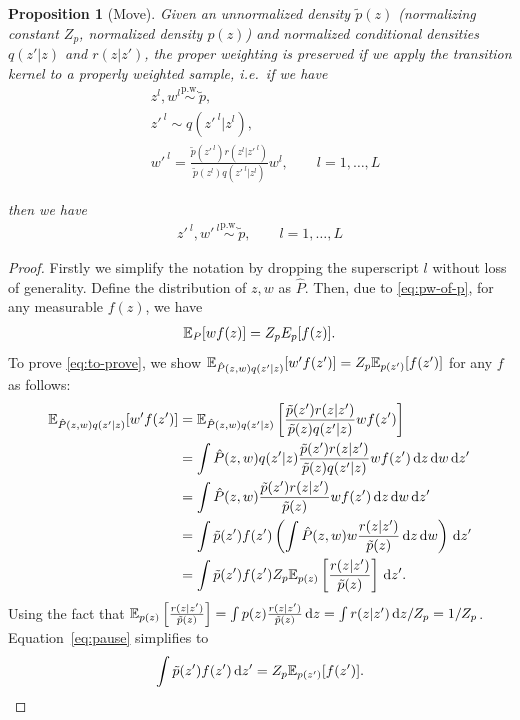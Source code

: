 \documentclass{article}
\newtheorem{proposition}{Proposition}
\theoremstyle{definition}
\newcommand{\given}{\lvert}
\newcommand{\pw}{\overset{\text{p.w.}}{\sim}
}
\begin{document}
\begin{proposition}[Move]
\label{proposition:extendedspace}
    Given an unnormalized density $\tilde p(z)$ (normalizing constant $Z_p$, normalized density $p(z)$) and normalized conditional densities $q(z' \given z)$ and $r(z \given z')$, the proper weighting is preserved if we apply the transition kernel to a properly weighted sample, i.e.~if we have
    \begin{align}
        &
        z^l, w^l \pw \tilde p, \label{eq:pw-of-p}\\[1em]
        &
         z'^{\:l} \sim q(z'^{\:l} \given z^l),  \label{eq:z-prime}\\[1em]
        &
        w'^{\:l} = \frac{\tilde p(z'^{\:l})r(z^l \given z'^{\:l})}{\tilde p(z^l)q(z'^{\:l} \given z^l)} w^l, \qquad l = 1, \ldots, L \label{eq:w-prime}
    \end{align}

then we have
    \begin{align}
        z'^{\:l}, w'^{\:l} \pw \tilde p, \qquad  l = 1, \ldots, L \label{eq:to-prove}
    \end{align}
\end{proposition}
\begin{proof}
    Firstly we simplify the notation by dropping the superscript $l$ without loss of generality. Define the distribution of $z, w$ as $\hat{P}$.
    Then, due to \eqref{eq:pw-of-p}, for any measurable $f(z)$, we have
    \begin{align*}
        \mathbb{E}_P[w f(z)] = Z_p E_{p}[f(z)].
    \end{align*}
    To prove \eqref{eq:to-prove}, we show $\E_{\hat{P}(z, w)q(z' \given z)}[w' f(z')] = Z_p \E_{p(z')}[f(z')]$ for any $f$ as follows:
    \begin{align}
        \E_{\hat{P}(z, w)q(z' \given z)}[w' f(z')]
        &= \E_{\hat{P}(z, w)q(z' \given z)}\left[\frac{\tilde p(z')r(z \given z')}{\tilde p(z)q(z' \given z)} w f(z')\right] 
        \nonumber\\
        &= \int \hat{P}(z, w)q(z' \given z) \frac{\tilde p(z')r(z \given z')}{\tilde p(z)q(z' \given z)} w f(z') \,\mathrm dz \,\mathrm dw \,\mathrm dz' 
        \nonumber\\
        &= \int \hat{P}(z, w) \frac{\tilde p(z')r(z \given z')}{\tilde p(z)} w f(z') \,\mathrm dz \,\mathrm dw \,\mathrm dz' 
        \nonumber\\
        &= \int \tilde p(z') f(z') \left(\int \hat{P}(z, w) w \frac{r(z \given z')}{\tilde p(z)}\,\mathrm dz \,\mathrm dw\right) \,\mathrm dz'
        \nonumber\\
        &= \int \tilde p(z') f(z') Z_p \E_{p(z)}\left[\frac{r(z \given z')}{\tilde p(z)}\right] \,\mathrm dz'. \label{eq:pause}
    \end{align}
    Using the fact that $\E_{p(z)}\left[\frac{r(z \given z')}{\tilde p(z)}\right] = \int p(z) \frac{r(z \given z')}{\tilde p(z)} \,\mathrm dz = \int r(z \given z') \,\mathrm dz / Z_p = 1 / Z_p$.
    Equation~\ref{eq:pause} simplifies to
    \begin{align*}
        \int \tilde p(z') f(z') \,\mathrm dz' = Z_p \mathbb{E}_{p(z')}[f(z')].
    \end{align*}
\end{proof}
\end{document}
